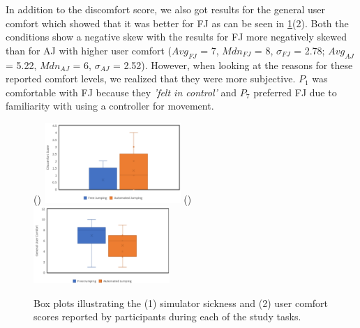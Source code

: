 In addition to the discomfort score, we also got results for the general user comfort which showed that it was better for FJ as can be seen in \cref{fig:user-comfort}(2). Both the conditions show a negative skew with the results for FJ more negatively skewed than for AJ with higher user comfort ($Avg_{FJ}$ = 7, $Mdn_{FJ}$ = 8, $\sigma_{FJ}$ = 2.78; $Avg_{AJ}$ = 5.22, $Mdn_{AJ}$ = 6, $\sigma_{AJ}$ = 2.52). However, when looking at the reasons for these reported comfort levels, we realized that they were more subjective. $P_1$ was comfortable with FJ because they \textit{'felt in control'} and $P_7$ preferred FJ due to familiarity with using a controller for movement. 
\begin{figure}[]
	()
	\includegraphics[width=0.46\textwidth]{images/simulator-sickness.pdf}
	()
	\includegraphics[width=0.46\textwidth]{images/user-comfort.pdf}
	\caption{Box plots illustrating the (1) simulator sickness and (2) user comfort scores reported by participants during each of the study tasks.}
	\label{fig:user-comfort}
\end{figure}

